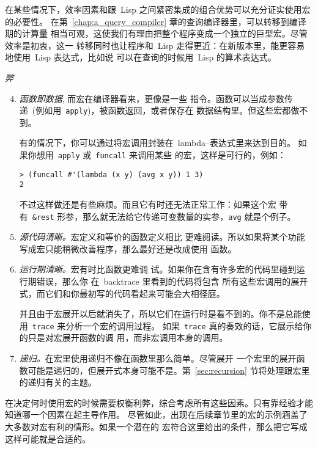 在某些情况下，效率因素和跟~Lisp 之间紧密集成的组合优势可以充分证实使用宏的必要性。
在第~\ref{chap:a_query_compiler} 章的查询编译器里，可以转移到编译期的计算量
相当可观，这使我们有理由把整个程序变成一个独立的巨型宏。尽管效率是初衷，这一
转移同时也让程序和~Lisp 走得更近：在新版本里，能更容易地使用~Lisp 表达式，比如说
可以在查询的时候用~Lisp 的算术表达式。

\begin{center}\large\textsl{弊}\end{center}
\begin{enumerate}
\setcounter{enumi}{3}
\item \emph{函数即数据}, 而宏在编译器看来，更像是一些
  指令。函数可以当成参数传递~(例如用~\texttt{apply})，被函数返回，或者保存在
  数据结构里。但这些宏都做不到。\label{the_cons_4}

  有的情况下，你可以通过将宏调用封装在~lambda--表达式里来达到目的。
  如果你想用~\texttt{apply} 或~\texttt{funcall} 来调用某些
  的宏，这样是可行的，例如：
\begin{lstlisting}
> (funcall #'(lambda (x y) (avg x y)) 1 3)
2
\end{lstlisting}
不过这样做还是有些麻烦。而且它有时还无法正常工作：如果这个宏
带有~\verb|&rest| 形参，那么就无法给它传递可变数量的实参，\texttt{avg} 就是个例子。
\item \emph{源代码清晰。}宏定义和等价的函数定义相比
  更难阅读。所以如果将某个功能写成宏只能稍微改善程序，那么最好还是改成使用
  函数。
\item\label{itm:clarity-at-runtime} \emph{运行期清晰。}宏有时比函数更难调
  试。如果你在含有许多宏的代码里碰到运行期错误，那么你
  在~backtrace 里看到的代码将包含
  所有这些宏调用的展开式，而它们和你最初写的代码看起来可能会大相径庭。\par
  并且由于宏展开以后就消失了，所以它们在运行时是看不到的。你不是总能使
  用~\texttt{trace} 来分析一个宏的调用过程。
  如果~\texttt{trace} 真的奏效的话，它展示给你的只是对宏展开函数的调
  用，而非宏调用本身的调用。
 
\item \emph{递归。}在宏里使用递归不像在函数里那么简单。尽管展开
  一个宏里的展开函数可能是递归的，但展开式本身可能不是。第~\ref{sec:recursion}
  节将处理跟宏里的递归有关的主题。
\end{enumerate}

在决定何时使用宏的时候需要权衡利弊，综合考虑所有这些因素。只有靠经验才能知道哪一个因素在起主导作用。
尽管如此，出现在后续章节里的宏的示例涵盖了大多数对宏有利的情形。如果一个潜在的
宏符合这里给出的条件，那么把它写成这样可能就是合适的。

